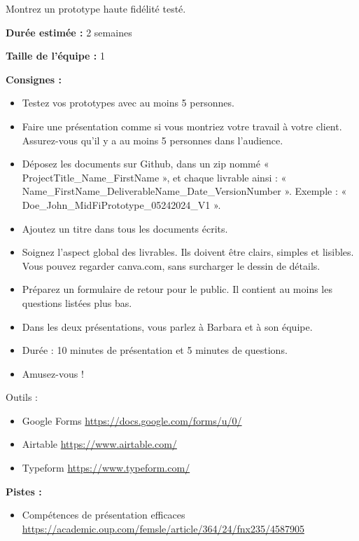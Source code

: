 \makeheaderfiles

Montrez un prototype haute fidélité testé.

\textbf{Durée estimée :} 2 semaines

\textbf{Taille de l'équipe :} 1

\textbf{Consignes :}

\begin{itemize}
\item Testez vos prototypes avec au moins 5 personnes.
\item Faire une présentation comme si vous montriez votre travail à votre client. Assurez-vous qu'il y a au moins 5 personnes dans l'audience.
\item Déposez les documents sur Github, dans un zip nommé « ProjectTitle\_Name\_FirstName », et chaque livrable ainsi : « Name\_FirstName\_DeliverableName\_Date\_VersionNumber ». Exemple : « Doe\_John\_MidFiPrototype\_05242024\_V1 ».
\item Ajoutez un titre dans tous les documents écrits.
\item Soignez l'aspect global des livrables. Ils doivent être clairs, simples et lisibles. Vous pouvez regarder canva.com, sans surcharger le dessin de détails.
\item Préparez un formulaire de retour pour le public. Il contient au moins les questions listées plus bas.
\item Dans les deux présentations, vous parlez à Barbara et à son équipe.
\item Durée : 10 minutes de présentation et 5 minutes de questions.
\item Amusez-vous !
\end{itemize}

Outils :

\begin{itemize}
\item Google Forms \url{https://docs.google.com/forms/u/0/}
\item Airtable \url{https://www.airtable.com/}
\item Typeform \url{https://www.typeform.com/}
\end{itemize}

\textbf{Pistes :}

\begin{itemize}
\item Compétences de présentation efficaces \url{https://academic.oup.com/femsle/article/364/24/fnx235/4587905}
\end{itemize}

